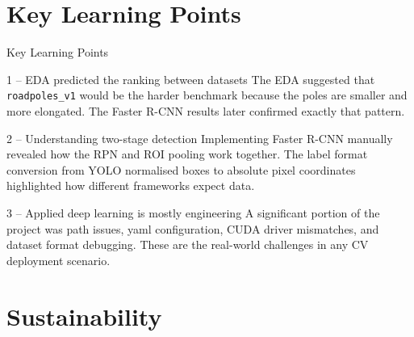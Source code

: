 \documentclass[aspectratio=169]{beamer}
\begin{document}
\section{Key Learning Points}

\begin{frame}[shrink=4]{Key Learning Points}
  \begin{block}{1 -- EDA predicted the ranking between datasets}
    The EDA suggested that \texttt{roadpoles\_v1} would be the harder benchmark because the poles are smaller and more elongated. The Faster R-CNN results later confirmed exactly that pattern.
  \end{block}
  \begin{block}{2 -- Understanding two-stage detection}
    Implementing Faster R-CNN manually revealed how the RPN and ROI pooling work together. The label format conversion from YOLO normalised boxes to absolute pixel coordinates highlighted how different frameworks expect data.
  \end{block}
  \begin{block}{3 -- Applied deep learning is mostly engineering}
    A significant portion of the project was path issues, yaml configuration, CUDA driver mismatches, and dataset format debugging. These are the real-world challenges in any CV deployment scenario.
  \end{block}
\end{frame}

\section{Sustainability}
\end{document}
